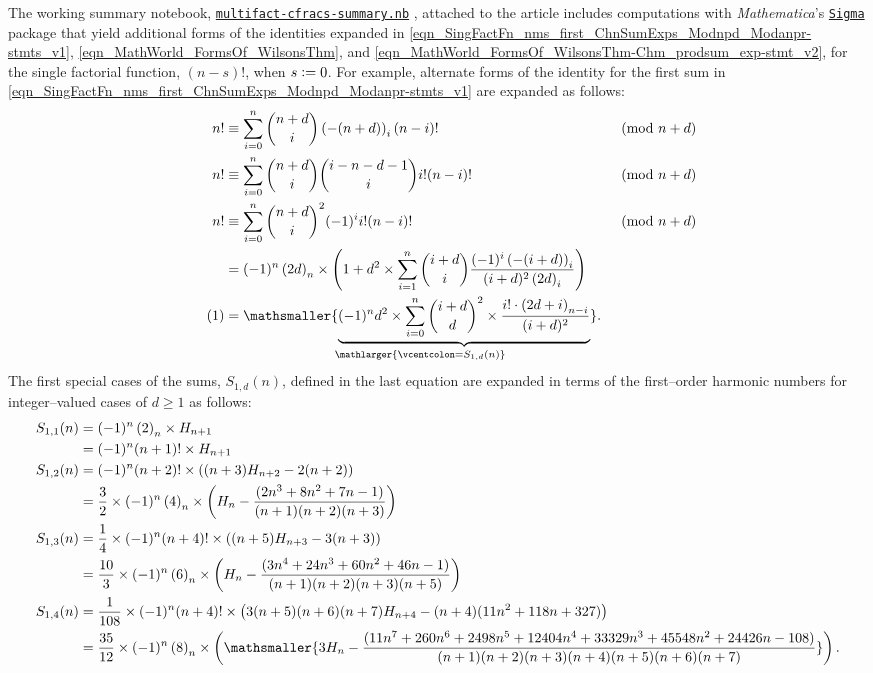 \documentclass[12pt,reqno]{article}
\numberwithin{sfootnote}{section}
\numberwithin{equation}{section}
\newcommand{\tagonce}[0]{
     \addtocounter{equation}{1}
     \tag{\theequation}
}
\theoremstyle{plain}
\theoremstyle{definition}
\theoremstyle{remark}
\newcommand{\defequals}{\ensuremath{\vcentcolon=}}
\newcommand{\undersetbrace}[2]{\ensuremath{\underset{\mathlarger{#1}}{\mathsmaller{\underbrace{#2}}}}}
\newcommand{\TheSummaryNBFile}[0]{\texttt{multifact-cfracs-summary.nb}}
\newcommand{\TheSummaryNBFileGoogleDriveLink}[0]{https://drive.google.com/file/d/0B6na6iIT7ICZRFltbTVVcmVpVk0/view?usp=drivesdk}
\renewcommand{\TheSummaryNBFile}{ 
     \href{\TheSummaryNBFileGoogleDriveLink}{\texttt{multifact-cfracs-summary.nb}}%
}
\newcommand{\Mm}[0]{\emph{Mathematica}}
\newcommand{\SigmaPkg}[0]{%
     \href{http://www.risc.jku.at/research/combinat/software/Sigma/index.php}{%
     \texttt{Sigma}}
}
\newcommand{\Pochhammer}[2]{\ensuremath{\left(#1\right)_{#2}}}
\begin{document}
The working summary notebook, \TheSummaryNBFile, 
attached to the article \citep{SUMMARYNBREF-STUB} 
includes computations with \Mm's \SigmaPkg package 
that yield additional forms of the identities expanded in 
\eqref{eqn_SingFactFn_nms_first_ChnSumExps_Modnpd_Modanpr-stmts_v1}, 
\eqref{eqn_MathWorld_FormsOf_WilsonsThm}, and 
\eqref{eqn_MathWorld_FormsOf_WilsonsThm-Chm_prodsum_exp-stmt_v2}, 
for the single factorial function, $(n-s)!$, when $s \defequals 0$. 
For example, 
alternate forms of the identity for the first sum in 
\eqref{eqn_SingFactFn_nms_first_ChnSumExps_Modnpd_Modanpr-stmts_v1} are 
expanded as follows: 
\begin{align*} 
n! & \equiv 
     \sum_{i=0}^{n} \binom{n+d}{i} 
     \Pochhammer{-(n+d)}{i} (n-i)! && \pmod{n+d} \\ 
n! & \equiv 
     \sum_{i=0}^{n} \binom{n+d}{i} \binom{i-n-d-1}{i} i! (n-i)! 
     && \pmod{n+d} \\ 
n! & \equiv 
     \sum_{i=0}^{n} \binom{n+d}{i}^{2} (-1)^{i} i! (n-i)! && \pmod{n+d} \\ 
   & = 
     (-1)^{n} \Pochhammer{2d}{n} \times \left( 
     1 + d^2 \times \sum_{i=1}^{n} \binom{i+d}{i} 
     \frac{(-1)^{i} \Pochhammer{-(i+d)}{i}}{(i+d)^2 \Pochhammer{2d}{i}} 
     \right) && \\ 
\tagonce\label{eqn_SingFactFn_nms_first_ChnSumExps_Modnpd_Modanpr-stmts_v2} 
   & = 
   \undersetbrace{\defequals S_{1,d}(n)}{ 
   (-1)^{n} d^{2} \times \sum_{i=0}^{n} \binom{i+d}{d}^{2} \times 
   \frac{i! \cdot \Pochhammer{2d+i}{n-i}}{(i+d)^{2}}
   }. && 
\end{align*} 
The first special cases of the sums, $S_{1,d}(n)$, 
defined in the last equation 
are expanded in terms of the first--order harmonic numbers 
for integer--valued cases of $d \geq 1$ as follows: 
\begin{align*} 
S_{1,1}(n) & = 
     (-1)^{n} \Pochhammer{2}{n} \times H_{n+1} \\ 
     & = 
     (-1)^{n} (n+1)! \times H_{n+1} \\ 
S_{1,2}(n) & = 
     (-1)^{n} (n+2)! \times \left( 
     (n+3) H_{n+2} - 2(n+2) 
     \right) \\ 
     & = 
     \frac{3}{2} \times (-1)^{n} \Pochhammer{4}{n} \times \left( 
     H_{n} - \frac{(2n^3+8n^2+7n-1)}{(n+1)(n+2)(n+3)} 
     \right) \\ 
S_{1,3}(n) & = 
     \frac{1}{4} \times (-1)^{n} (n+4)! \times \left( 
     (n+5) H_{n+3} - 3(n+3) 
     \right) \\ 
     & = 
     \frac{10}{3} \times (-1)^{n} \Pochhammer{6}{n} \times \left( 
     H_{n} - \frac{(3n^4+24n^3+60n^2+46n-1)}{(n+1)(n+2)(n+3)(n+5)} 
     \right) \\ 
S_{1,4}(n) & = 
     \frac{1}{108} \times (-1)^{n} (n+4)! \times \left( 
     3(n+5)(n+6)(n+7) H_{n+4} - (n+4)(11n^2+118n+327)  
     \right) \\ 
     & = 
     \frac{35}{12} \times (-1)^{n} \Pochhammer{8}{n} \times \left( 
     \mathsmaller{ 
     3 H_{n} - 
     \frac{(11n^7+260n^6+2498n^5+12404n^4+33329n^3+45548n^2+24426n-108)}{ 
     (n+1)(n+2)(n+3)(n+4)(n+5)(n+6)(n+7)} 
     } 
     \right). 
\end{align*} 
\end{document}
